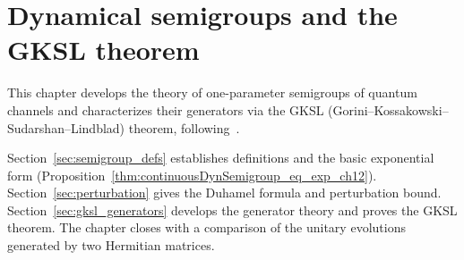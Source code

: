 
\chapter{Dynamical semigroups and the GKSL theorem}
\label{ch:semigroup}

This chapter develops the theory of one-parameter semigroups of quantum
channels and characterizes their generators via the
GKSL (Gorini--Kossakowski--Sudarshan--Lindblad) theorem,
following~\cite[Chapter~7]{Wolf2012Quantum}.

Section~\ref{sec:semigroup_defs} establishes definitions and
the basic exponential form
(Proposition~\ref{thm:continuousDynSemigroup_eq_exp_ch12}).
Section~\ref{sec:perturbation} gives the Duhamel formula and
perturbation bound.
Section~\ref{sec:gksl_generators} develops the generator theory
and proves the GKSL theorem.
The chapter closes with a comparison of the unitary evolutions generated by
two Hermitian matrices.







